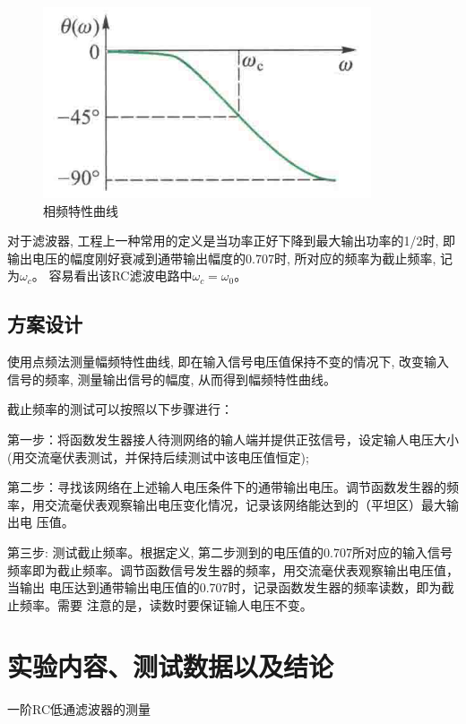 \documentclass[10pt, a4paper]{article} %
\begin{document}
\begin{figure}[ht]
\begin{minipage}[ht]{0.3\textwidth}
        \includegraphics[width=\linewidth]{image/3.png}
        \caption{相频特性曲线}
        \label{fig:side:c}
    \end{minipage}
\end{figure}

对于滤波器, 工程上一种常用的定义是当功率正好下降到最大输出功率的1/2时, 即输出电压的幅度刚好衰减到通带输出幅度的0.707时, 所对应的频率为截止频率, 记为$\omega_c$。 容易看出该RC滤波电路中$\omega_c = \omega_0$。


\subsection{方案设计}
使用点频法测量幅频特性曲线, 即在输入信号电压值保持不变的情况下, 改变输入信号的频率, 测量输出信号的幅度, 从而得到幅频特性曲线。

截止频率的测试可以按照以下步骤进行：

第一步：将函数发生器接人待测网络的输人端并提供正弦信号，设定输人电压大小
(用交流毫伏表测试，并保持后续测试中该电压值恒定);

第二步：寻找该网络在上述输人电压条件下的通带输出电压。调节函数发生器的频
率，用交流毫伏表观察输出电压变化情况，记录该网络能达到的（平坦区）最大输出电
压值。

第三步: 测试截止频率。根据定义, 第二步测到的电压值的0.707所对应的输入信号
频率即为截止频率。调节函数信号发生器的频率，用交流毫伏表观察输出电压值，当输出
电压达到通带输出电压值的0.707时，记录函数发生器的频率读数，即为截止频率。需要
注意的是，读数时要保证输人电压不变。

\section{实验内容、测试数据以及结论}
一阶RC低通滤波器的测量
\end{document}
